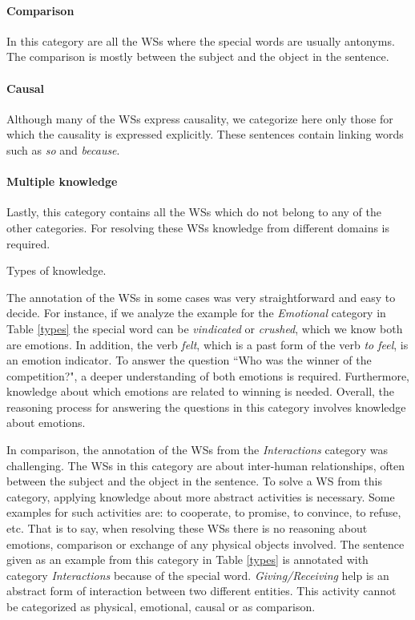 \paragraph{Comparison} In this category are all the WSs where the special words are usually antonyms. The comparison is mostly between the subject and the object in the sentence. 

\paragraph{Causal} Although many of the WSs express causality, we categorize here only those for which the causality is expressed explicitly. These sentences contain linking words such as \textit{so} and \textit{because}.

\paragraph{Multiple knowledge} Lastly, this category contains all the WSs which do not belong to any of the other categories. For resolving these WSs knowledge from different domains is required.

\begin{table} [h!]
	 
	\caption{{\label{types}}Types of knowledge.}
\end{table}

The annotation of the WSs in some cases was very straightforward and easy to decide. For instance, if we analyze the example for the \textit{Emotional} category in Table \ref{types} the special word can be \textit{vindicated} or \textit{crushed}, which we know both are emotions. In addition, the verb \textit{felt}, which is a past form of the verb \textit{to feel}, is an emotion indicator. To answer the question ``Who was the winner of the competition?", a deeper understanding of both emotions is required. Furthermore, knowledge about which emotions are related to winning is needed. 
Overall, the reasoning process for answering the questions in this category involves knowledge about emotions. 

In comparison, the annotation of the WSs from the \textit{Interactions} category was challenging. The WSs in this category are about inter-human relationships, often between the subject and the object in the sentence. 
To solve a WS from this category, applying knowledge about more abstract activities is necessary. Some examples for such activities are: to cooperate, to promise, to convince, to refuse, etc. That is to say, when resolving these WSs there is no reasoning about emotions, comparison or exchange of any physical objects involved.  
The sentence given as an example from this category in Table \ref{types} is annotated with category \textit{Interactions} because of the special word. \textit{Giving/Receiving} help is an abstract form of interaction between two different entities. This activity cannot be categorized as physical, emotional, causal or as comparison.

